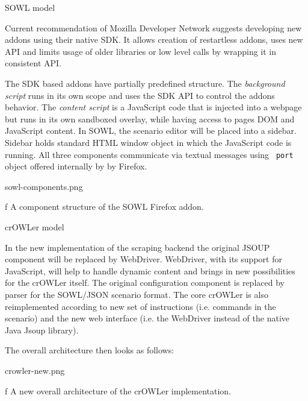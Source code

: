 \secc SOWL model

Current recommendation of Mozilla Developer Network suggests developing new
addons using their native SDK. It allows creation of restartless addons, uses 
new API and limits usage of older libraries or low level calls by wrapping it 
in consistent API. 

The SDK based addons have partially predefined structure. The {\em background script}
runs in its own scope and uses the SDK API to control the addons behavior.
The {\em content script} is a JavaScript code that is injected into a webpage
but runs in its own sandboxed overlay, while having access to pages DOM and
JavaScript content. In SOWL, the scenario editor will be placed into a sidebar.
Sidebar holds standard HTML window object in which the JavaScript code is
running.  All three components communicate via textual messages using {\tt
port} object offered internally by by Firefox. 

\midinsert
\picw=12cm \cinspic sowl-components.png
\caption/f A component structure of the SOWL Firefox addon. 
\endinsert


\secc crOWLer model

In the new implementation of the scraping backend the original JSOUP component
will be replaced by WebDriver. WebDriver, with its support for JavaScript,
will help to handle dynamic content and brings in new possibilities for the
crOWLer itself. The original configuration component is replaced by parser for
the SOWL/JSON scenario format. The core crOWLer is also reimplemented
according to new set of instructions (i.e. commands in the scenario) and the
new web interface (i.e. the WebDriver instead of the native Java Jsoup
library). 

The overall architecture then looks as follows: 

\midinsert
\picw=7.5cm \cinspic crowler-new.png
\caption/f A new overall architecture of the crOWLer implementation. 
\endinsert


%


